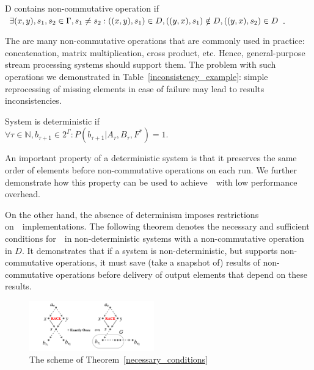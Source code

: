 \begin{definition}{D contains non-commutative operation}
if\\ 
$\exists (x,y), s_1, s_2 \in \Gamma, s_1 \neq s_2: \\ ((x,y),s_1)\in D, \\ ((y,x),s_1)\notin D, \\ ((y,x),s_2)\in D$.
\end{definition}

The are many non-commutative operations that are commonly used in practice: concatenation, matrix multiplication, cross product, etc. Hence, general-purpose stream processing systems should support them. The problem with such operations we demonstrated in Table~\ref{inconsistency_example}: simple reprocessing of missing elements in case of failure may lead to results inconsistencies.

\begin{definition}{System is deterministic}
if\\ 
$\forall{\tau\in{\mathbb{N}}, b_{\tau+1}\in{2^{\Gamma}}}:P(b_{\tau+1}|A_{\tau},B_\tau,F^{*})=1$.
\end{definition}

An important property of a deterministic system is that it preserves the same order of elements before non-commutative operations on each run. We further demonstrate how this property can be used to achieve~\eo\ with low performance overhead.

On the other hand, the absence of determinism imposes restrictions on~\eo\ implementations. The following theorem denotes the necessary and sufficient conditions for~\eo\ in non-deterministic systems with a non-commutative operation in $D$. It demonstrates that if a system is non-deterministic, but supports non-commutative operations, it must save (take a snapshot of) results of non-commutative operations before delivery of output elements that depend on these results.

\begin{figure}[htbp]
  \centering
  \includegraphics[width=0.48\textwidth]{pics/theorem-pic}
  \caption{The scheme of Theorem~\ref{necessary_conditions}}
  \label {theorem-pic}
\end{figure}

